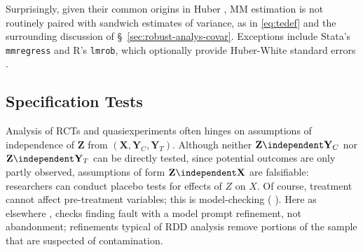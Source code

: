 Surprisingly, given their common origins in %
Huber \citeyearpar{huber1964robust}, MM estimation is not routinely
paired with sandwich estimates of variance, as in \eqref{eq:tedef} and
the surrounding discussion of \S~\ref{sec:robust-analys-covar}.
Exceptions include Stata's \texttt{mmregress} and R's \texttt{lmrob},
which optionally provide Huber-White standard errors
\citep{verardiCroux2009robust,rousseuwetal2015robustbase}.

\subsection{Specification Tests}\label{sec:specification}

Analysis of RCTs and quasiexperiments often hinges on assumptions of
independence of
 $\mathbf{Z}$ from $(\mathbf{X}, \mathbf{Y}_{C}, \mathbf{Y}_{T})$.
 Although neither $\mathbf{Z} \independent \mathbf{Y}_{C}$ nor
 $\mathbf{Z} \independent \mathbf{Y}_{T}$ can be directly tested,
 since potential outcomes are only partly observed, assumptions of form
 $\mathbf{Z} \independent \mathbf{X}$ are falsifiable: researchers can
 conduct placebo tests for effects of $Z$ on $X$.
Of course, treatment cannot affect pre-treatment variables; this is
model-checking (%
\citealp[][\S~5.13]{cox2006pos}%
).  Here as
 elsewhere \citep{box1980sab}, checks finding fault with a model prompt
 refinement, not abandonment; refinements typical of RDD analysis remove portions of
 the sample that are suspected of contamination.

